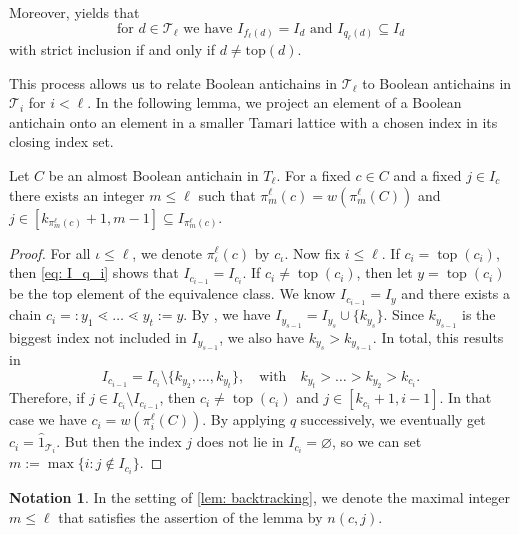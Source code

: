\documentclass{preprint}
\newcommand{\topmap}{\operatorname{top}}
\newcommand{\cT}{\mathcal{T}}
\theoremstyle{definition}
\newtheorem*{notation*}{Notation}
\begin{document}
Moreover,  yields that
\begin{equation}\label{eq: I_q_i}
    \text{for } d\in \cT_\ell \text{ we have }I_{f_\ell(d)} = I_d \text{ and } I_{q_\ell(d)}\subseteq I_d
\end{equation}
with strict inclusion if and only if $d\neq \text{top}(d)$.

This process allows us to relate Boolean antichains in $\cT_\ell$ to Boolean antichains in $\cT_i$ for $i<\ell$. In the following lemma, we project an element of a Boolean antichain onto an element in a smaller Tamari lattice with a chosen index in its closing index set.

\begin{lemma}\label{lem: backtracking}
    Let $C$ be an almost Boolean antichain in $T_\ell$. For a fixed $c \in C$ and a fixed $j \in I_c$ there exists an integer $m \leq \ell$ such that
    $\pi_m^\ell(c) = w(\pi_m^\ell(C))$ and $j \in [k_{\pi_m^\ell(c)} + 1, m - 1] \subseteq I_{\pi_m^\ell(c)}$.
\end{lemma}
\begin{proof}
    For all $\iota\leq \ell$, we denote $\pi_\iota^\ell(c)$ by $c_\iota$. Now fix $i\leq \ell$. If $c_i = \topmap(c_i)$, then \eqref{eq: I_q_i} shows that $I_{c_{i-1}} = I_{c_i}$. If $c_i \neq \topmap(c_i)$, then let $y = \topmap(c_i)$ be the top element of the equivalence class. We know $I_{c_{i-1}} = I_y$ and there exists a chain $c_i =: y_1 \lessdot \dots \lessdot y_t := y$. By , we have $I_{y_{s-1}} = I_{y_s} \cup \{k_{y_s} \}$. Since $k_{y_{s-1}}$ is the biggest index not included in $I_{y_{s-1}}$, we also have $k_{y_s} > k_{y_{s-1}}$. In total, this results in
    \begin{equation}\label{eq: index set change}
        I_{c_{i-1}} = I_{c_i} \setminus \{k_{y_2} , \dots, k_{y_t} \}, \quad \text{with} \quad k_{y_t} > \dots > k_{y_2} > k_{c_i}.
    \end{equation}
    Therefore, if $j\in I_{c_i}\setminus I_{c_{i-1}}$, then $c_i \neq \topmap(c_i)$ and $j \in [k_{c_i}+1, i-1]$. In that case we have $c_i = w(\pi_i^\ell(C))$.
    By applying $q$ successively, we eventually get $c_i = \hat{1}_{\cT_i}$. But then the index $j$ does not lie in $I_{c_i} = \varnothing$, so we can set $m:= \max\{i\colon j\notin I_{c_i}\}$.
\end{proof}

\begin{notation*}
    In the setting of \ref{lem: backtracking}, we denote the maximal integer $m \leq \ell$ that satisfies the assertion of the lemma by $n(c,j)$.
\end{notation*}
\end{document}
